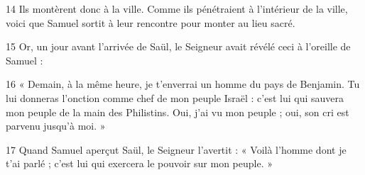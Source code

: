 

14 Ils montèrent donc à la ville. Comme ils pénétraient à l’intérieur de la ville, voici que Samuel sortit à leur rencontre pour monter au lieu sacré.

15 Or, un jour avant l’arrivée de Saül, le Seigneur avait révélé ceci à l’oreille de Samuel :

16 « Demain, à la même heure, je t’enverrai un homme du pays de Benjamin. Tu lui donneras l’onction comme chef de mon peuple Israël : c’est lui qui sauvera mon peuple de la main des Philistins. Oui, j’ai vu mon peuple ; oui, son cri est parvenu jusqu’à moi. »

17 Quand Samuel aperçut Saül, le Seigneur l’avertit : « Voilà l’homme dont je t’ai parlé ; c’est lui qui exercera le pouvoir sur mon peuple. »
